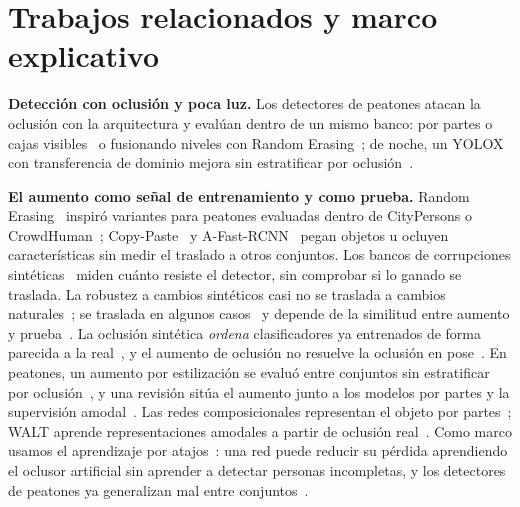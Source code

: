 \documentclass[conference]{IEEEtran}
\begin{document}
\section{Trabajos relacionados y marco explicativo}
\textbf{Detección con oclusión y poca luz.} Los detectores de peatones atacan la oclusión con la arquitectura y evalúan dentro de un mismo banco: por partes o cajas visibles~\cite{Zhang2018orcnn,Zhou2018bibox,Song2022prnet} o fusionando niveles con Random Erasing~\cite{Huan2023mlffcsp}; de noche, un YOLOX con transferencia de dominio mejora sin estratificar por oclusión~\cite{Yi2022yolox}.

\textbf{El aumento como señal de entrenamiento y como prueba.} Random Erasing~\cite{Zhong2020} inspiró variantes para peatones evaluadas dentro de CityPersons o CrowdHuman~\cite{Shang2018synthocc,Chi2020pedhunter}; Copy-Paste~\cite{Ghiasi2021copypaste} y A-Fast-RCNN~\cite{Wang2017afast} pegan objetos u ocluyen características sin medir el traslado a otros conjuntos. Los bancos de corrupciones sintéticas~\cite{Michaelis2019winter} miden cuánto resiste el detector, sin comprobar si lo ganado se traslada. La robustez a cambios sintéticos casi no se traslada a cambios naturales~\cite{Taori2020shifts}; se traslada en algunos casos~\cite{Hendrycks2021manyfaces} y depende de la similitud entre aumento y prueba~\cite{Mintun2021interaction}. La oclusión sintética \emph{ordena} clasificadores ya entrenados de forma parecida a la real~\cite{Kassaw2026occl}, y el aumento de oclusión no resuelve la oclusión en pose~\cite{Pytel2021tilting}. En peatones, un aumento por estilización se evaluó entre conjuntos sin estratificar por oclusión~\cite{Cygert2020robust}, y una revisión sitúa el aumento junto a los modelos por partes y la supervisión amodal~\cite{Saleh2021occlusion}. Las redes composicionales representan el objeto por partes~\cite{Kortylewski2020compnet,Wang2020compnet}; WALT aprende representaciones amodales a partir de oclusión real~\cite{Reddy2022walt}. Como marco usamos el aprendizaje por atajos~\cite{Geirhos2020shortcut}: una red puede reducir su pérdida aprendiendo el oclusor artificial sin aprender a detectar personas incompletas, y los detectores de peatones ya generalizan mal entre conjuntos~\cite{Hasan2021elephant,Sukesh2024camped}.
\end{document}
